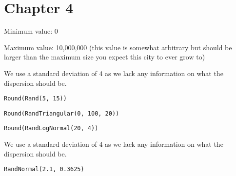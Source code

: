 \documentclass[]{memoir}
\begin{document}
\section{Chapter 4}


Minimum value: 0

Maximum value: 10,000,000 (this value is somewhat arbitrary but should
be larger than the maximum size you expect this city to ever grow to)


We use a standard deviation of 4 as we lack any information on what the
dispersion should be.

\lstinline!Round(Rand(5, 15))!


\lstinline!Round(RandTriangular(0, 100, 20))!


\lstinline!Round(RandLogNormal(20, 4))!

We use a standard deviation of 4 as we lack any information on what the
dispersion should be.


\lstinline!RandNormal(2.1, 0.3625)!

\end{document}
